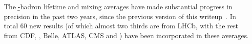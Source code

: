 The \b-hadron lifetime and mixing averages have made substantial 
progress in precision in the past two years, since the previous 
version of this writeup~\cite{Amhis:2012bh}. In total 60 new results 
(of which almost two thirds are from LHCb, with the rest from CDF,
\dzero, Belle, ATLAS, CMS and \babar)
have been incorporated in these averages.
%
%
%
%
%
%

